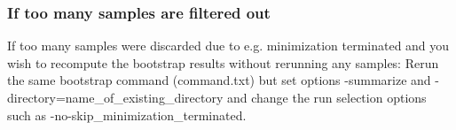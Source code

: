 \subsubsection*{If too many samples are filtered out}
If too many samples were discarded due to e.g. minimization terminated and you wish to recompute the bootstrap results without rerunning any samples: 
Rerun the same bootstrap command (command.txt) but set options -summarize
and -directory=name\_of\_existing\_directory and change the
run selection options such as -no-skip\_minimization\_terminated. 



